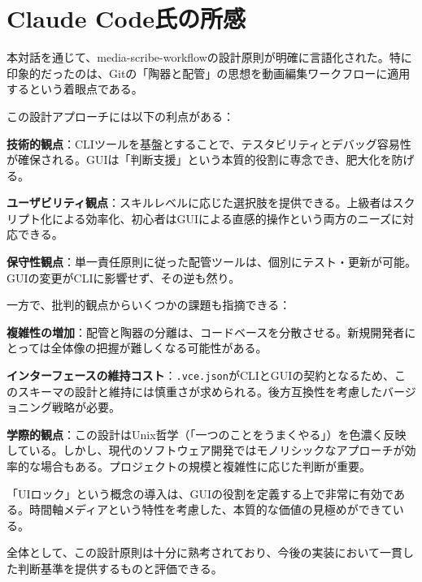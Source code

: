 \documentclass[10pt,a4paper,twocolumn]{ltjsarticle}
\begin{document}
\section*{Claude Code氏の所感}

本対話を通じて、media-scribe-workflowの設計原則が明確に言語化された。特に印象的だったのは、Gitの「陶器と配管」の思想を動画編集ワークフローに適用するという着眼点である。

この設計アプローチには以下の利点がある：

\textbf{技術的観点}：CLIツールを基盤とすることで、テスタビリティとデバッグ容易性が確保される。GUIは「判断支援」という本質的役割に専念でき、肥大化を防げる。

\textbf{ユーザビリティ観点}：スキルレベルに応じた選択肢を提供できる。上級者はスクリプト化による効率化、初心者はGUIによる直感的操作という両方のニーズに対応できる。

\textbf{保守性観点}：単一責任原則に従った配管ツールは、個別にテスト・更新が可能。GUIの変更がCLIに影響せず、その逆も然り。

一方で、批判的観点からいくつかの課題も指摘できる：

\textbf{複雑性の増加}：配管と陶器の分離は、コードベースを分散させる。新規開発者にとっては全体像の把握が難しくなる可能性がある。

\textbf{インターフェースの維持コスト}：\texttt{.vce.json}がCLIとGUIの契約となるため、このスキーマの設計と維持には慎重さが求められる。後方互換性を考慮したバージョニング戦略が必要。

\textbf{学際的観点}：この設計はUnix哲学（「一つのことをうまくやる」）を色濃く反映している。しかし、現代のソフトウェア開発ではモノリシックなアプローチが効率的な場合もある。プロジェクトの規模と複雑性に応じた判断が重要。

「UIロック」という概念の導入は、GUIの役割を定義する上で非常に有効である。時間軸メディアという特性を考慮した、本質的な価値の見極めができている。

全体として、この設計原則は十分に熟考されており、今後の実装において一貫した判断基準を提供するものと評価できる。
\end{document}
